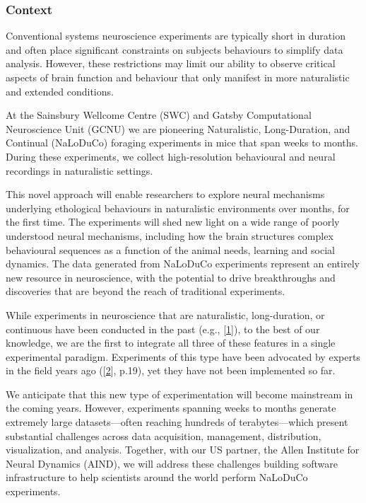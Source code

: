 \subsubsection{Context}

Conventional systems neuroscience experiments are typically short in duration
and often place significant constraints on subjects behaviours to simplify data
analysis.
%
However, these restrictions may limit our ability to observe critical
aspects of brain function and behaviour that only manifest in more naturalistic
and extended conditions.

At the Sainsbury Wellcome Centre (SWC) and Gatsby Computational Neuroscience
Unit (GCNU) we are pioneering Naturalistic, Long-Duration, and Continual
(NaLoDuCo) foraging experiments in mice that span weeks to months. During these
experiments, we collect high-resolution behavioural and neural recordings in
naturalistic settings.

This novel  approach will enable researchers to explore neural mechanisms
underlying ethological behaviours in naturalistic environments over months, for
the first time.  The experiments will shed new light on a wide range of poorly
understood neural mechanisms, including how the brain structures complex
behavioural sequences as a function of the animal needs, learning and social
dynamics.
%
The data generated from NaLoDuCo experiments represent an entirely new resource
in neuroscience, with the potential to drive breakthroughs and discoveries that
are beyond the reach of traditional experiments.

While experiments in neuroscience that are naturalistic, long-duration, or
continuous have been conducted in the past (e.g.,
[\href{https://pubmed.ncbi.nlm.nih.gov/37656619/}{1}]), to the best of our
knowledge, we are the first to integrate all three of these features in a
single experimental paradigm.
%
Experiments of this type have been advocated by experts in the field years ago
([\href{https://pubmed.ncbi.nlm.nih.gov/31600508/}{2}], p.19), yet they have
not been implemented so far.

We anticipate that this new type of experimentation will become mainstream in
the coming years.
%
However, experiments spanning weeks to months generate extremely large
datasets—often reaching hundreds of terabytes—which present substantial
challenges across data acquisition, management, distribution, visualization,
and analysis.
%
Together, with our US partner, the Allen Institute for Neural Dynamics (AIND),
we will address these challenges building software infrastructure to help
scientists around the world perform NaLoDuCo experiments.

